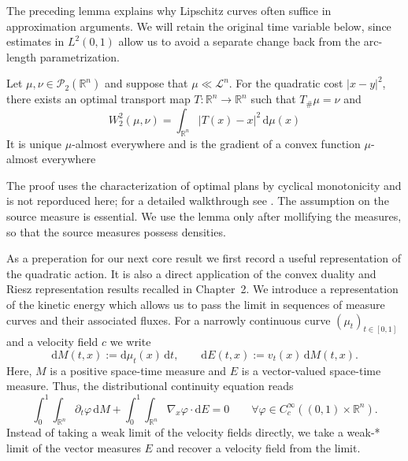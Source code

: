 The preceding lemma explains why Lipschitz curves often suffice in approximation arguments. We will retain the original time variable below, since estimates in $L^2(0,1)$ allow us to avoid a separate change back from the arc-length parametrization. %
\begin{lemma}
	\label{lem:brenier}
	Let $\mu,\nu\in\mathscr{P}_2(\mathbb{R}^n)$ and suppose that $\mu\ll\mathcal{L}^n$. For the quadratic cost $|x-y|^2$, there exists an optimal transport map $T:\mathbb{R}^n\to \mathbb{R}^n$ such that $T_\#\mu = \nu$ and 
	$$
	W_2^2(\mu,\nu) = \int_{\mathbb{R}^n}|T(x)-x|^2\,\mathrm{d}\mu(x)
	$$
	It is unique $\mu$-almost everywhere and is the gradient of a convex function $\mu$-almost everywhere
\end{lemma}

The proof uses the characterization of optimal plans by cyclical monotonicity and is not reporduced here; for a detailed walkthrough see \cite[Theorem~2.3]{AmbrosioSavare2007}. The assumption on the source measure is essential. We use the lemma only after mollifying the measures, so that the source measures possess densities.

As a preperation for our next core result we first record a useful representation of the quadratic action. It is also a direct application of the convex duality and Riesz representation results recalled in Chapter~2. We introduce a representation of the kinetic energy which allows us to pass the limit in sequences of measure curves and their associated fluxes. For a narrowly continuous curve $(\mu_t)_{t\in[0,1]}$ and a velocity field $c$ we write
$$
\mathrm{d}M(t,x):=\mathrm{d}\mu_t(x)\,\mathrm dt,\qquad \mathrm{d}E(t,x):=v_t(x)\,\mathrm dM(t,x).
$$
Here, $M$ is a positive space-time measure and $E$ is a vector-valued space-time measure. Thus, the distributional continuity equation reads
$$
\int_0^1\int_{\mathbb{R}^n}\partial_t\varphi\,\mathrm dM + \int_0^1\int_{\mathbb{R}^n}\nabla_x\varphi\cdot\mathrm dE=0\qquad \forall\varphi\in C_c^\infty((0,1)\times \mathbb{R}^n).
$$
Instead of taking a weak limit of the velocity fields directly, we take a weak-* limit of the vector measures $E$ and recover a velocity field from the limit.

